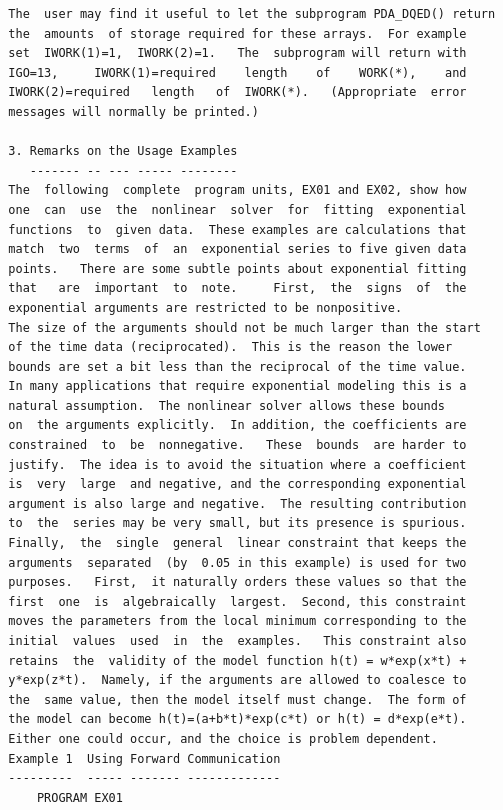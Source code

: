 \documentclass[11pt,twoside]{article}
\begin{document}
\begin{verbatim}
  The  user may find it useful to let the subprogram PDA_DQED() return
  the  amounts  of storage required for these arrays.  For example
  set  IWORK(1)=1,  IWORK(2)=1.   The  subprogram will return with
  IGO=13,     IWORK(1)=required    length    of    WORK(*),    and
  IWORK(2)=required   length   of  IWORK(*).   (Appropriate  error
  messages will normally be printed.)

  3. Remarks on the Usage Examples
     ------- -- --- ----- --------
  The  following  complete  program units, EX01 and EX02, show how
  one  can  use  the  nonlinear  solver  for  fitting  exponential
  functions  to  given data.  These examples are calculations that
  match  two  terms  of  an  exponential series to five given data
  points.   There are some subtle points about exponential fitting
  that   are  important  to  note.     First,  the  signs  of  the
  exponential arguments are restricted to be nonpositive.
  The size of the arguments should not be much larger than the start
  of the time data (reciprocated).  This is the reason the lower
  bounds are set a bit less than the reciprocal of the time value.
  In many applications that require exponential modeling this is a
  natural assumption.  The nonlinear solver allows these bounds
  on  the arguments explicitly.  In addition, the coefficients are
  constrained  to  be  nonnegative.   These  bounds  are harder to
  justify.  The idea is to avoid the situation where a coefficient
  is  very  large  and negative, and the corresponding exponential
  argument is also large and negative.  The resulting contribution
  to  the  series may be very small, but its presence is spurious.
  Finally,  the  single  general  linear constraint that keeps the
  arguments  separated  (by  0.05 in this example) is used for two
  purposes.   First,  it naturally orders these values so that the
  first  one  is  algebraically  largest.  Second, this constraint
  moves the parameters from the local minimum corresponding to the
  initial  values  used  in  the  examples.   This constraint also
  retains  the  validity of the model function h(t) = w*exp(x*t) +
  y*exp(z*t).  Namely, if the arguments are allowed to coalesce to
  the  same value, then the model itself must change.  The form of
  the model can become h(t)=(a+b*t)*exp(c*t) or h(t) = d*exp(e*t).
  Either one could occur, and the choice is problem dependent.
  Example 1  Using Forward Communication
  ---------  ----- ------- -------------
      PROGRAM EX01


\end{verbatim}
\end{document}

